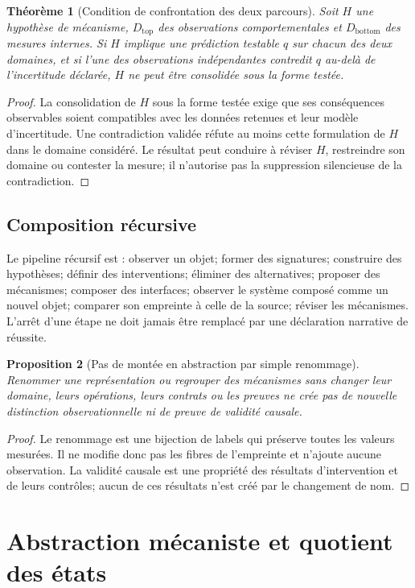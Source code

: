 \documentclass[11pt,oneside]{book}
\newtheorem{theoreme}{Théorème}[chapter]
\newtheorem{proposition}[theoreme]{Proposition}
\theoremstyle{definition}
\theoremstyle{remark}
\newcommand{\1}{\mathbf 1}
\begin{document}
\begin{theoreme}[Condition de confrontation des deux parcours]
Soit $H$ une hypothèse de mécanisme, $D_{\mathrm{top}}$ des observations comportementales et $D_{\mathrm{bottom}}$ des mesures internes. Si $H$ implique une prédiction testable $q$ sur chacun des deux domaines, et si l'une des observations indépendantes contredit $q$ au-delà de l'incertitude déclarée, $H$ ne peut être consolidée sous la forme testée.
\end{theoreme}
\begin{proof}
La consolidation de $H$ sous la forme testée exige que ses conséquences observables soient compatibles avec les données retenues et leur modèle d'incertitude. Une contradiction validée réfute au moins cette formulation de $H$ dans le domaine considéré. Le résultat peut conduire à réviser $H$, restreindre son domaine ou contester la mesure; il n'autorise pas la suppression silencieuse de la contradiction.
\end{proof}

\section{Composition récursive}
Le pipeline récursif est : observer un objet; former des signatures; construire des hypothèses; définir des interventions; éliminer des alternatives; proposer des mécanismes; composer des interfaces; observer le système composé comme un nouvel objet; comparer son empreinte à celle de la source; réviser les mécanismes. L'arrêt d'une étape ne doit jamais être remplacé par une déclaration narrative de réussite.

\begin{proposition}[Pas de montée en abstraction par simple renommage]
Renommer une représentation ou regrouper des mécanismes sans changer leur domaine, leurs opérations, leurs contrats ou les preuves ne crée pas de nouvelle distinction observationnelle ni de preuve de validité causale.
\end{proposition}
\begin{proof}
Le renommage est une bijection de labels qui préserve toutes les valeurs mesurées. Il ne modifie donc pas les fibres de l'empreinte et n'ajoute aucune observation. La validité causale est une propriété des résultats d'intervention et de leurs contrôles; aucun de ces résultats n'est créé par le changement de nom.
\end{proof}

\chapter{Abstraction mécaniste et quotient des états}
\end{document}
